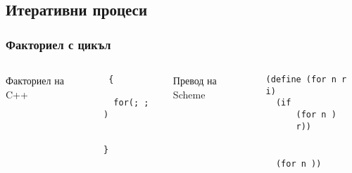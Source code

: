 \documentclass{beamer}
\begin{document}
\subsection{Итеративни процеси}


\begin{frame}[fragile]
  \frametitle{Факториел с цикъл}

  \begin{columns}[t,onlytextwidth]
    Факториел на C++
    \vspace{0.5em}

\tt{ \{}\\
\verb#  #\\
\verb#  #\tt{for(; ; )}\\
\verb#    #\\
\verb#  #\\
\tt{\}}

  \pause

    Превод на Scheme
    \vspace{0.5em}

\tt{(define (for n \fbox r \fbox i)}\\
\verb#  #\tt{(if }\\
\verb#      #\tt{(for n  )}\\
\verb#      #\tt{\fbox r))}\\
\ \\
\\
\verb#  #\tt{(for n  ))}
  \end{columns}
\end{frame}
\end{document}
